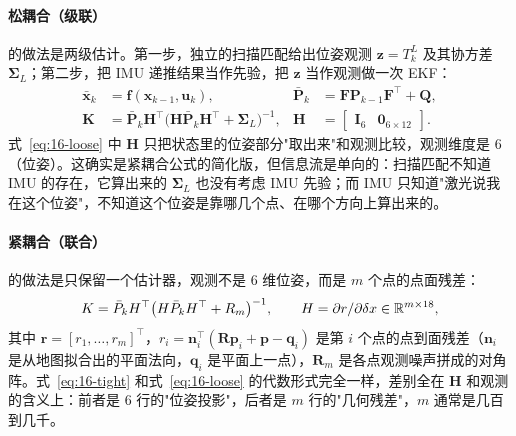 \paragraph{松耦合（级联）} 的做法是两级估计。第一步，独立的扫描匹配给出位姿观测 $\bm{z}=T_{k}^{L}$ 及其协方差 $\bm{\Sigma}_L$；第二步，把 IMU 递推结果当作先验，把 $\bm{z}$ 当作观测做一次 EKF：
\begin{equation}\label{eq:16-loose}
  \begin{aligned}
    \bar{\bm{x}}_k&=\bm{f}(\bm{x}_{k-1},\bm{u}_k), &\bar{\bm{P}}_k&=\bm{F}\bm{P}_{k-1}\bm{F}^{\top}+\bm{Q},\\
    \bm{K}&=\bar{\bm{P}}_k\bm{H}^{\top}\bigl(\bm{H}\bar{\bm{P}}_k\bm{H}^{\top}+\bm{\Sigma}_L\bigr)^{-1}, & \bm{H}&=\begin{bmatrix}\bm{I}_6&\bm{0}_{6\times12}\end{bmatrix}.
  \end{aligned}
\end{equation}
式~\eqref{eq:16-loose} 中 $\bm{H}$ 只把状态里的位姿部分"取出来"和观测比较，观测维度是 6（位姿）。这确实是紧耦合公式的简化版，但信息流是单向的：扫描匹配不知道 IMU 的存在，它算出来的 $\bm{\Sigma}_L$ 也没有考虑 IMU 先验；而 IMU 只知道"激光说我在这个位姿"，不知道这个位姿是靠哪几个点、在哪个方向上算出来的。

\paragraph{紧耦合（联合）} 的做法是只保留一个估计器，观测不是 6 维位姿，而是 $m$ 个点的点面残差：
\begin{equation}\label{eq:16-tight}
  K=\bar{P}_kH^{\top}\bigl(H\bar{P}_kH^{\top}+R_m\bigr)^{-1},\qquad
  H=\partial r/\partial\delta x\in\mathbb{R}^{m\times18},
\end{equation}
其中 $\bm{r}=[r_1,\dots,r_m]^{\top}$，$r_i=\bm{n}_i^{\top}(\bm{R}\bm{p}_i+\bm{p}-\bm{q}_i)$ 是第 $i$ 个点的点到面残差（$\bm{n}_i$ 是从地图拟合出的平面法向，$\bm{q}_i$ 是平面上一点），$\bm{R}_m$ 是各点观测噪声拼成的对角阵。式~\eqref{eq:16-tight} 和式~\eqref{eq:16-loose} 的代数形式完全一样，差别全在 $\bm{H}$ 和观测的含义上：前者是 6 行的"位姿投影"，后者是 $m$ 行的"几何残差"，$m$ 通常是几百到几千。

